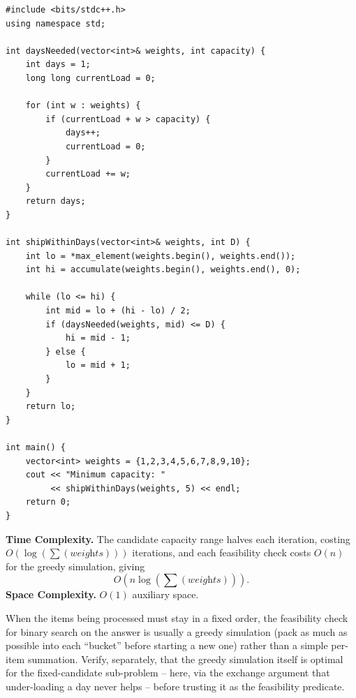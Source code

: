 \begin{lstlisting}
#include <bits/stdc++.h>
using namespace std;

int daysNeeded(vector<int>& weights, int capacity) {
    int days = 1;
    long long currentLoad = 0;

    for (int w : weights) {
        if (currentLoad + w > capacity) {
            days++;
            currentLoad = 0;
        }
        currentLoad += w;
    }
    return days;
}

int shipWithinDays(vector<int>& weights, int D) {
    int lo = *max_element(weights.begin(), weights.end());
    int hi = accumulate(weights.begin(), weights.end(), 0);

    while (lo <= hi) {
        int mid = lo + (hi - lo) / 2;
        if (daysNeeded(weights, mid) <= D) {
            hi = mid - 1;
        } else {
            lo = mid + 1;
        }
    }
    return lo;
}

int main() {
    vector<int> weights = {1,2,3,4,5,6,7,8,9,10};
    cout << "Minimum capacity: "
         << shipWithinDays(weights, 5) << endl;
    return 0;
}
\end{lstlisting}

\begin{complexitybox}
\textbf{Time Complexity.} The candidate capacity range halves each
iteration, costing $O(\log(\sum(\textit{weights})))$ iterations, and each
feasibility check costs $O(n)$ for the greedy simulation, giving
\[
  O(n \log(\sum(\textit{weights}))).
\]
\textbf{Space Complexity.} $O(1)$ auxiliary space.
\end{complexitybox}

\begin{takeawaybox}
When the items being processed must stay in a fixed order, the
feasibility check for binary search on the answer is usually a greedy
simulation (pack as much as possible into each ``bucket'' before starting
a new one) rather than a simple per-item summation. Verify, separately,
that the greedy simulation itself is optimal for the fixed-candidate
sub-problem -- here, via the exchange argument that under-loading a day
never helps -- before trusting it as the feasibility predicate.
\end{takeawaybox}
